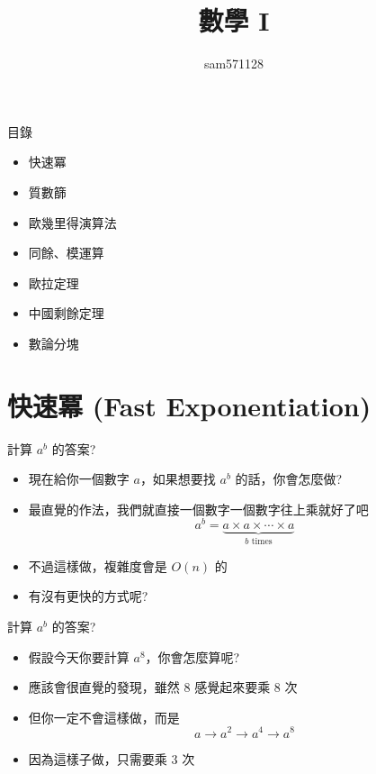 \documentclass[aspectratio=169]{beamer}
\title{數學 I}
\author{sam571128}
\date[附中延平競程讀書會]
\begin{document}
    \begin{frame}
        \titlepage
    \end{frame}
    
    \begin{frame}{目錄}
        \begin{itemize}
            \item 快速冪
            \item 質數篩
            \item 歐幾里得演算法
            \item 同餘、模運算
            \item 歐拉定理
            \item 中國剩餘定理
            \item 數論分塊
        \end{itemize}
    \end{frame}
    
    \section{快速冪 (Fast Exponentiation)}
    
    \begin{frame}{計算 $a^b$ 的答案?}
        \begin{itemize}
            \item 現在給你一個數字 $a$，如果想要找 $a^b$ 的話，你會怎麼做?
            \item<2-> 最直覺的作法，我們就直接一個數字一個數字往上乘就好了吧
            $$a^b = \underbrace{a \times a \times \cdots \times a}_{b \text{ times}}$$
            \item<3-> 不過這樣做，複雜度會是 $O(n)$ 的
            \item<3-> 有沒有更快的方式呢?
        \end{itemize}
    \end{frame}
    
    \begin{frame}{計算 $a^b$ 的答案?}
        \begin{itemize}
            \item 假設今天你要計算 $a^8$，你會怎麼算呢?
            \item<2-> 應該會很直覺的發現，雖然 $8$ 感覺起來要乘 $8$ 次
            \item<2-> 但你一定不會這樣做，而是
            $$a \rightarrow a^2 \rightarrow a^4 \rightarrow a^8$$
            \item<3-> 因為這樣子做，只需要乘 $3$ 次
        \end{itemize}
    \end{frame}
    
\end{document}
